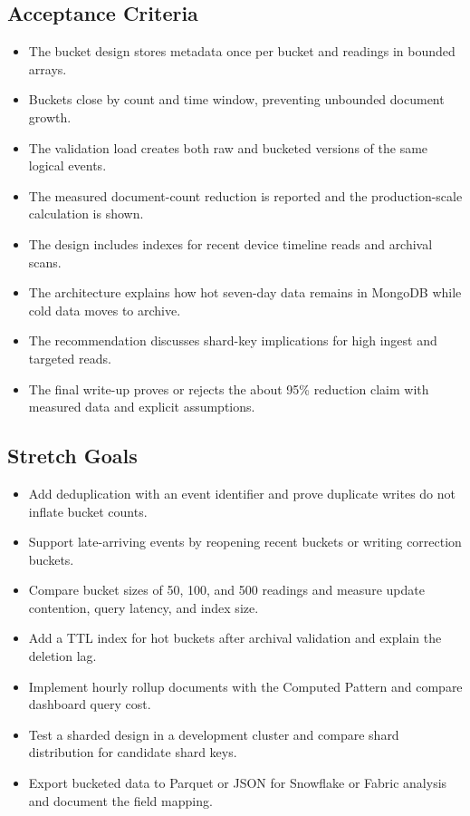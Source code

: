 \subsection*{Acceptance Criteria}
\begin{itemize}
    \item The bucket design stores metadata once per bucket and readings in bounded arrays.
    \item Buckets close by count and time window, preventing unbounded document growth.
    \item The validation load creates both raw and bucketed versions of the same logical events.
    \item The measured document-count reduction is reported and the production-scale calculation is shown.
    \item The design includes indexes for recent device timeline reads and archival scans.
    \item The architecture explains how hot seven-day data remains in MongoDB while cold data moves to archive.
    \item The recommendation discusses shard-key implications for high ingest and targeted reads.
    \item The final write-up proves or rejects the about 95\% reduction claim with measured data and explicit assumptions.
\end{itemize}

\subsection*{Stretch Goals}
\begin{itemize}
    \item Add deduplication with an event identifier and prove duplicate writes do not inflate bucket counts.
    \item Support late-arriving events by reopening recent buckets or writing correction buckets.
    \item Compare bucket sizes of 50, 100, and 500 readings and measure update contention, query latency, and index size.
    \item Add a TTL index for hot buckets after archival validation and explain the deletion lag.
    \item Implement hourly rollup documents with the Computed Pattern and compare dashboard query cost.
    \item Test a sharded design in a development cluster and compare shard distribution for candidate shard keys.
    \item Export bucketed data to Parquet or JSON for Snowflake or Fabric analysis and document the field mapping.
\end{itemize}
